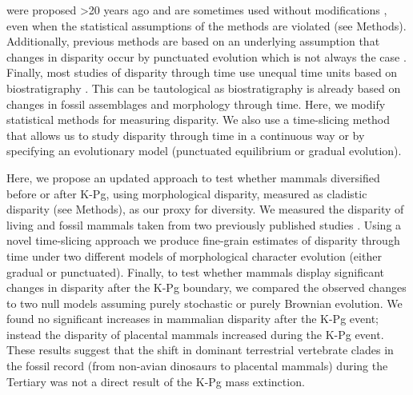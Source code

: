 \documentclass[12pt,letterpaper]{article}
\begin{document}
\begin{enumerate}
    were proposed \textgreater 20 years ago \citep{Foote01071994,Wills1994} and are sometimes used without modifications \citep[e.g.,][]{brusatte50,Brusatte12092008,cisneros2010,thorneresetting2011,prentice2011,brusattedinosaur2012,toljagictriassic-jurassic2013,ruta2013,bentonmodels2014,bensonfaunal2014}, even when the statistical assumptions of the methods are violated (see Methods).
    Additionally, previous methods are based on an underlying assumption that changes in disparity occur by punctuated evolution \citep[e.g.][]{Wesley-Hunt2005} which is not always the case \citep{Hunt21042015}.
    Finally, most studies of disparity through time use unequal time units based on biostratigraphy \citep{Brusatte12092008,brusattedinosaur2012,toljagictriassic-jurassic2013}. 
    This can be tautological as biostratigraphy is already based on changes in fossil assemblages and morphology through time.
    Here, we modify statistical methods for measuring disparity.
    We also use a time-slicing method that allows us to study disparity through time in a continuous way or by specifying an evolutionary model (punctuated equilibrium or gradual evolution).
  \end{enumerate}

Here, we propose an updated approach to test whether mammals diversified before or after K-Pg, using morphological disparity, measured as cladistic disparity (see Methods), as our proxy for diversity.
We measured the disparity of living and fossil mammals taken from two previously published studies \citep{Slater2012MEE,beckancient2014}. %
Using a novel time-slicing approach we produce fine-grain estimates of disparity through time under two different models of morphological character evolution (either gradual or punctuated). 
Finally, to test whether mammals display significant changes in disparity after the K-Pg boundary, we compared the observed changes to two null models assuming purely stochastic or purely Brownian evolution. 
We found no significant increases in mammalian disparity after the K-Pg event; instead the disparity of placental mammals increased during the K-Pg event. 
These results suggest that the shift in dominant terrestrial vertebrate clades in the fossil record (from non-avian dinosaurs to placental mammals) during the Tertiary was not a direct result of the K-Pg mass extinction.
\end{document}
